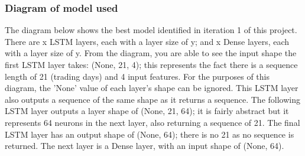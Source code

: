 \subsubsection{Diagram of model used}
The diagram below shows the best model identified in iteration 1 of this project. There are x LSTM layers,
each with a layer size of y; and x Dense layers, each with a layer size of y. From the diagram, you are able
to see the input shape the first LSTM layer takes: (None, 21, 4); this represents the fact there is a sequence
length of 21 (trading days) and 4 input features. For the purposes of this diagram, the 'None' value
of each layer's shape can be ignored. This LSTM layer also outputs a sequence of the same shape as it returns
a sequence. The following LSTM layer outputs a layer shape of (None, 21, 64); it is fairly abstract
but it represents 64 neurons in the next layer, also returning a sequence of 21.
The final LSTM layer has an output shape of (None, 64); there is no 21 as no sequence is returned.
The next layer is a Dense layer, with an input shape of (None, 64).
